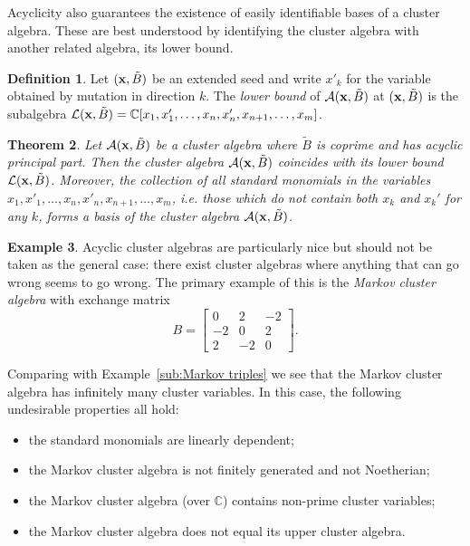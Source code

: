 \documentclass{amsart}
\newtheorem{theorem}{Theorem}[section]
\theoremstyle{definition}
\newtheorem{definition}[theorem]{Definition}
\newtheorem{example}[theorem]{Example}
\theoremstyle{remark}
\numberwithin{equation}{section}
\newcommand{\cA}{{\mathcal{A}}}
\newcommand{\cL}{{\mathcal{L}}}
\newcommand{\x}{{\bf x}}
\newcommand{\bx}{{\bf x}}
\newcommand{\CC}{{\mathbb{C}}}
\begin{document}
  Acyclicity also guarantees the existence of easily identifiable bases of a cluster algebra.  These are best understood by identifying the cluster algebra with another related algebra, its lower bound.
  \begin{definition}
    Let $(\x,\tilde B)$ be an extended seed and write $x'_k$ for the variable obtained by mutation in direction $k$.  The \emph{lower bound} of $\cA(\x,\tilde B)$ at $(\x,\tilde B)$ is the subalgebra $\cL(\x,\tilde B)=\CC[x_1,x'_1,\ldots,x_n,x'_n,x_{n+1},\ldots,x_m]$.
  \end{definition}

  \begin{theorem}\cite{BFZ05}\label{th:lower bounds}
    Let $\cA(\x,\tilde B)$ be a cluster algebra where $\tilde B$ is coprime and has acyclic principal part.  Then the cluster algebra $\cA(\x,\tilde B)$ coincides with its lower bound $\cL(\x,\tilde B)$.  Moreover, the collection of all \emph{standard monomials} in the variables $x_1,x'_1,\ldots,x_n,x'_n,x_{n+1},\ldots,x_m$, i.e. those which do not contain both $x_k$ and $x_k'$ for any $k$, forms a basis of the cluster algebra $\cA(\bx,\tilde B)$.
  \end{theorem}

  \begin{example}
    Acyclic cluster algebras are particularly nice but should not be taken as the general case: there exist cluster algebras where anything that can go wrong seems to go wrong.  The primary example of this is the \emph{Markov cluster algebra} with exchange matrix 
    \[B=\left[\begin{array}{ccc} 0 & 2 & -2\\ -2 & 0 & 2\\ 2 & -2 & 0\end{array}\right].\]
    
    Comparing with Example~\ref{sub:Markov triples} we see that the Markov cluster algebra has infinitely many cluster variables.  In this case, the following undesirable properties all hold:
    \begin{itemize}
      \item the standard monomials are linearly dependent;
      \item the Markov cluster algebra is not finitely generated and not Noetherian;
      \item the Markov cluster algebra (over $\CC$) contains non-prime cluster variables;
      \item the Markov cluster algebra does not equal its upper cluster algebra.
    \end{itemize}
  \end{example}
\end{document}
